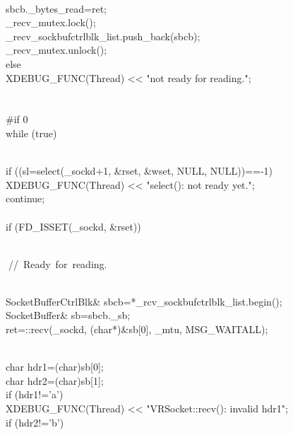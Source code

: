 \documentclass{article}
\begin{document}
{{{\\
                         sbcb._bytes_read=ret;
\\
                         _recv_mutex.lock();
\\
                         _recv_sockbufctrlblk_list.push_back(sbcb);
\\
                         _recv_mutex.unlock();
\\
                 } else {
\\
                         XDEBUG_FUNC(Thread) << "not ready for reading.\n";
\\
                 }
\\
         }
\\
 #if 0
\\
         while (true) {
\\
                 if ((sl=select(_sockd+1, &rset, &wset, NULL, NULL))==-1) {
\\
                         XDEBUG_FUNC(Thread) << "select(): not ready yet.\n";
\\
                         continue;
\\
                 }
\\
                 if (FD_ISSET(_sockd, &rset)) {
\\
                         
\hbox{// Ready for reading.}\strut\\
                         SocketBufferCtrlBlk& sbcb=*_rcv_sockbufctrlblk_list.begin();
\\
                         SocketBuffer& sb=sbcb._sb;
\\
                 ret=::recv(_sockd, (char*)&sb[0], _mtu, MSG_WAITALL);
\\
                 }
\\
                 char hdr1=(char)sb[0];
\\
                 char hdr2=(char)sb[1];
\\
                 if (hdr1!='a')
\\
                         XDEBUG_FUNC(Thread) << "VRSocket::recv(): invalid hdr1\n";
\\
                 if (hdr2!='b')
}}
\end{document}
